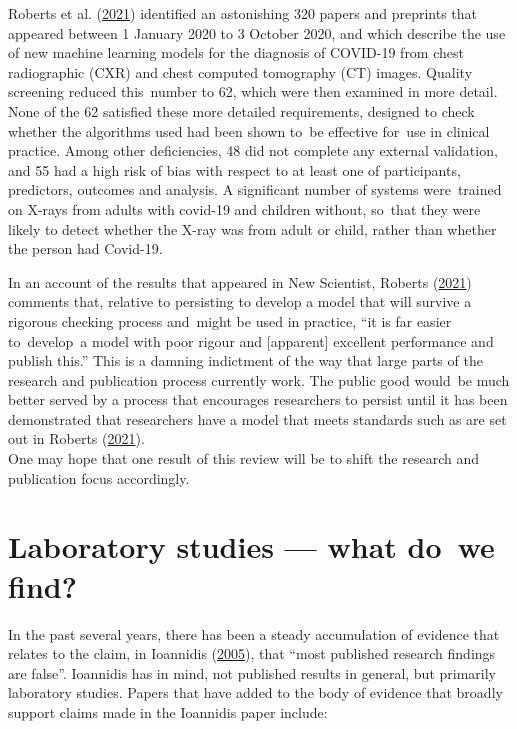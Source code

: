 \documentclass[
  10pt,
  b5paper]{book}
\begin{document}
Roberts et al. (\protect\hyperlink{ref-roberts2021common}{2021}) identified an astonishing 320 papers and preprints
that appeared between 1 January 2020 to 3 October 2020, and which
describe the use of new machine learning models for the diagnosis of
COVID-19 from chest radiographic (CXR) and chest computed tomography
(CT) images. Quality screening reduced this~number to 62, which were
then examined in more detail. None of the 62 satisfied these more
detailed requirements, designed to check whether the algorithms used
had been shown to~be effective for~use in clinical practice. Among
other deficiencies, 48 did not complete any external validation, and
55 had a high risk of bias with respect to at least one of
participants, predictors, outcomes and analysis. A significant number
of systems were~trained on X-rays from adults with covid-19 and
children without, so~that they were likely to detect whether the
X-ray was from adult or child, rather than whether the person had
Covid-19.

In an account of the results that appeared in New Scientist,
Roberts (\protect\hyperlink{ref-roberts2021AIcovid19}{2021}) comments that, relative to persisting to
develop a model that will survive a rigorous
checking process and~might be used in practice, ``it is far easier
to~develop~a model with poor rigour and {[}apparent{]} excellent
performance and publish this.'' This is a damning indictment of
the way that large parts of the research and publication process
currently work. The public good would~be much better served
by a process that encourages researchers to persist until it
has been demonstrated that researchers have a model that meets
standards such as are set out in Roberts (\protect\hyperlink{ref-roberts2021common}{2021}).\\
One may hope that one result of this review will be to shift
the research and publication focus accordingly.

\hypertarget{sec:lab}{%
\section{Laboratory studies --- what do~we find?}\label{sec:lab}}

In the past several years, there has been a steady accumulation
of evidence that relates to the claim, in Ioannidis (\protect\hyperlink{ref-r19_ioannidis_2005}{2005}),
that ``most published research findings are false''. Ioannidis
has in mind, not published results in general, but primarily
laboratory studies. Papers that have added to the
body of evidence that broadly support claims made in the
Ioannidis paper include:
\end{document}
